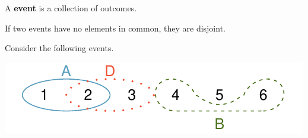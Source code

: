 \documentclass{beamer}
\begin{document}
\begin{frame}
\begin{definition}
A \textbf{event} is a collection of outcomes.
\end{definition}\pause

\begin{note}
If two events have no elements in common, they are disjoint.
\end{note}\pause

\begin{example}
Consider the following events.
\begin{center}
\includegraphics{disjointSets.pdf}
\end{center}\pause

\pause
{}\pause

\vspace{1mm}
\pause
{}\pause

\vspace{1mm}
\pause
{}
\end{example}
\end{frame}
\end{document}

